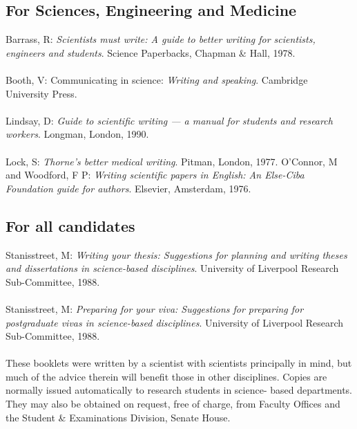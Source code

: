 \subsection{For Sciences, Engineering and Medicine}
Barrass, R: \emph{Scientists must write: A guide to better writing for 
scientists, engineers and students}. Science Paperbacks, Chapman \& 
Hall, 1978. 
\\
\\
Booth, V: Communicating in science: \emph{Writing and speaking}. 
Cambridge University Press. 
\\
\\
Lindsay, D: \emph{Guide to scientific writing --- a manual for students and 
research workers}. Longman, London, 1990. 
\\
\\
Lock, S: \emph{Thorne's better medical writing}. Pitman, London, 1977. 
O'Connor, M and Woodford, F P: \emph{Writing scientific papers in English: 
An Else-Ciba Foundation guide for authors}. Elsevier, Amsterdam, 
1976. 
\subsection{For all candidates}
Stanisstreet, M: \emph{Writing your thesis: Suggestions for planning and 
writing theses and dissertations in science-based disciplines}. 
University of Liverpool Research Sub-Committee, 1988. 
\\
\\
Stanisstreet, M: \emph{Preparing for your viva: Suggestions for preparing for 
postgraduate vivas in science-based disciplines}. University of 
Liverpool Research Sub-Committee, 1988. 
\\
\\
These booklets were written by a scientist with scientists principally in 
mind, but much of the advice therein will benefit those in other disciplines. 
Copies are normally issued automatically to research students in science-
based departments. They may also be obtained on request, free of charge, 
from Faculty Offices and the Student \& Examinations Division, Senate 
House. 
